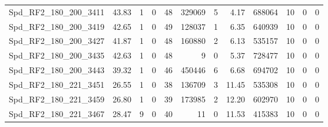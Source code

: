 \begin{longtable}[c]{@{}lrrrrrrrrrrr@{}}
Spd\_RF2\_180\_200\_3411      & 43.83                  & 1                       & 0                       & 48                     & 329069                  & 5                       & 4.17                    & 688064                   & 10                       & 0                        & 0                        \\
Spd\_RF2\_180\_200\_3419      & 42.65                  & 1                       & 0                       & 49                     & 128037                  & 1                       & 6.35                    & 640939                   & 10                       & 0                        & 0                        \\
Spd\_RF2\_180\_200\_3427      & 41.87                  & 1                       & 0                       & 48                     & 160880                  & 2                       & 6.13                    & 535157                   & 10                       & 0                        & 0                        \\
Spd\_RF2\_180\_200\_3435      & 42.63                  & 1                       & 0                       & 48                     & 9                       & 0                       & 5.37                    & 728477                   & 10                       & 0                        & 0                        \\
Spd\_RF2\_180\_200\_3443      & 39.32                  & 1                       & 0                       & 46                     & 450446                  & 6                       & 6.68                    & 694702                   & 10                       & 0                        & 0                        \\
Spd\_RF2\_180\_221\_3451      & 26.55                  & 1                       & 0                       & 38                     & 136709                  & 3                       & 11.45                   & 535308                   & 10                       & 0                        & 0                        \\
Spd\_RF2\_180\_221\_3459      & 26.80                  & 1                       & 0                       & 39                     & 173985                  & 2                       & 12.20                   & 602970                   & 10                       & 0                        & 0                        \\
Spd\_RF2\_180\_221\_3467      & 28.47                  & 9                       & 0                       & 40                     & 11                      & 0                       & 11.53                   & 415383                   & 10                       & 0                        & 0                        \\

\end{longtable}
